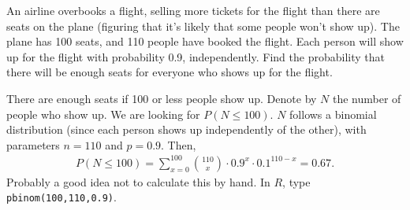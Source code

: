 
\setcounter{theorem}{8}
\begin{exercise}[BH.3.17]
  An airline overbooks a flight, selling more tickets for the flight than there are seats on the plane (figuring that it’s likely that some people won’t show up). The plane has 100 seats, and 110 people have booked the flight. Each person will show up for the flight with probability 0.9, independently. Find the probability that there will be enough seats for everyone who shows up for the flight.
\begin{solution}
	There are enough seats if 100 or less people show up. Denote by $N$ the number of people who show up. We are looking for $P(N\leq 100)$. $N$ follows a binomial distribution (since each person shows up independently of the other), with parameters $n=110$ and $p=0.9$. Then,
	\begin{align*}
		P(N\leq 100) = \sum_{x=0}^{100}{110 \choose x}\cdot 0.9^{x}\cdot 0.1^{110-x} = 0.67.
	\end{align*}
	Probably a good idea not to calculate this by hand. In $R$, type \texttt{pbinom(100,110,0.9)}.
\end{solution}
\end{exercise}


